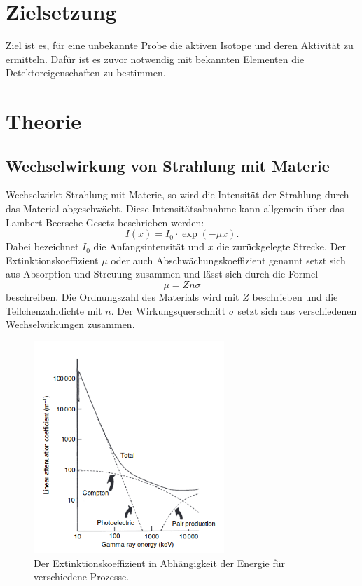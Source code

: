 \section{Zielsetzung}
Ziel ist es, für eine unbekannte Probe die aktiven Isotope und deren Aktivität zu ermitteln.
Dafür ist es zuvor notwendig mit bekannten Elementen die Detektoreigenschaften
zu bestimmen.

\section{Theorie}
\subsection{Wechselwirkung von Strahlung mit Materie}
\label{subsec:WW}
Wechselwirkt Strahlung mit Materie, so wird die Intensität der Strahlung durch das Material
abgeschwächt. Diese Intensitätsabnahme kann allgemein über das Lambert-Beersche-Gesetz beschrieben werden:
\begin{equation}
  I(x)=I_0\cdot\exp(-\mu x).
  \label{eqn:lambert}
\end{equation}
Dabei bezeichnet $I_{0}$ die Anfangsintensität und $x$ die zurückgelegte Strecke.
Der Extinktionskoeffizient $\mu$ oder auch Abschwächungskoeffizient genannt
setzt sich aus Absorption und Streuung zusammen und lässt sich durch die Formel
\begin{equation}
  \mu=Zn\sigma
\end{equation}
beschreiben. Die Ordnungszahl des Materials wird mit $Z$ beschrieben und die Teilchenzahldichte mit $n$.
Der Wirkungsquerschnitt $\sigma$ setzt sich aus verschiedenen Wechselwirkungen zusammen.
\begin{figure}[H]
  \centering
  \includegraphics[height=8cm]{Extin.png}
  \caption{Der Extinktionskoeffizient in Abhängigkeit der Energie für verschiedene Prozesse. \cite{Gilmore2}}
  \label{fig:Extin}
\end{figure}

